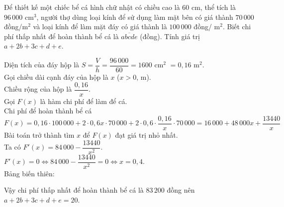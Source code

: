 \begin{ex}%
Để thiết kế một chiếc bể cá hình chữ nhật có chiều cao là $60$ cm, thể tích là $96\,000$ cm$^{3}$, người thợ dùng loại kính để sử dụng làm mặt bên có giá thành $70\,000$ đồng/m$^{2}$ và loại kính để làm mặt đáy có giá thành là $100\,000$ đồng/ m$^{2}$. Biết chi phí thấp nhất để hoàn thành bể cá là $\overline{abcde}$ (đồng). Tính giá trị $a+2b+3c+d+e$.
	\loigiai
	{
Diện tích của đáy hộp là $S=\dfrac{V}{h}=\dfrac{96\,000}{60}=1600$ cm$^2$ $=0{,}16$ m$^2$.\\
Gọi chiều dài cạnh đáy của hộp là $x$ ($x>0$, m).\\
Chiều rộng của hộp là $\dfrac{0{,}16}{x}$.\\
Gọi $F(x)$ là hàm chi phí để làm để cá.\\
Chi phí để hoàn thành bể cá
$$F(x)=0{,}16 \cdot 100\,000+2\cdot0{,}6x \cdot 70\,000+2 \cdot 0{,}6 \cdot \dfrac{0{,}16}{x} \cdot 70\,000=16\,000+48\,000 x+\dfrac{13440}{x}$$
Bài toán trở thành tìm $x$ để $F(x)$ đạt giá trị nhỏ nhất.\\
Ta có $F'(x)=84\,000-\dfrac{13440}{x^{2}}$.\\
$F'(x)=0 \Leftrightarrow 84\,000-\dfrac{13440}{x^{2}}=0 \Leftrightarrow x=0{,}4$.\\
Bảng biến thiên:
\begin{center}

\end{center}

Vậy chi phí thấp nhất để hoàn thành bể cá là $83\,200$ đồng nên $a+2b+3c+d+e=20$.
	}
\end{ex}

